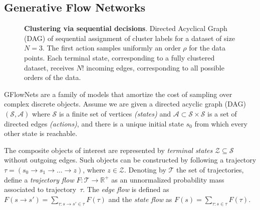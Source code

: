 \subsection{Generative Flow Networks} 
\label{sec:gflonet_review}
\begin{figure*}[t!]
	\begin{center}
	\end{center}
	\caption{{\bf Clustering via sequential decisions}. 
 Directed Acyclical Graph (DAG) of sequential
 assignment of cluster labels  for a dataset of size $N=3$. The first action samples uniformly an order $\rho$ for the data points.  Each terminal state, corresponding to a fully clustered dataset, receives $N!$ incoming edges, corresponding to all possible orders of the data. 
	} 
	\label{fig:dag}	
\end{figure*}

GFlowNets \citep{bengio2021flow,bengio2023gflownet}
are a family of  models that amortize the 
cost of sampling over complex discrete objects. 
Assume we are given 
a directed acyclic graph (DAG) $(\mathcal{S}, \mathcal{A})$
where $\mathcal{S}$ is a finite set of vertices {\it (states)} and  $\mathcal{A} \subset \mathcal{S} \times \mathcal{S}$ is a
set of directed edges {\it (actions)}, and there is a unique initial state $s_0$ from which every other state is reachable. 

The composite objects of interest are represented by 
{\it terminal states} $\mathcal{Z} \subseteq \mathcal{S}$ without outgoing edges. Such objects can be constructed by following a trajectory 
$\tau = (s_0 \rightarrow s_1 \rightarrow \ldots
\rightarrow z)$, where $z \in \mathcal{Z}$. 
Denoting by $\mathcal{T}$ the set of trajectories, 
\cite{bengio2023gflownet} define a {\it trajectory flow} $F:\mathcal{T} \rightarrow \mathbb{R}^+$ as an unnormalized probability mass associated 
to trajectory~$\tau$. 
The {\it edge flow} is defined as  
$ F(s \rightarrow s') = \sum_{\tau: s \rightarrow s' \in \tau } F(\tau)$
and the {\it state flow} as 
$ F(s) = \sum_{\tau: s \in \tau } F(\tau)$. 

%

